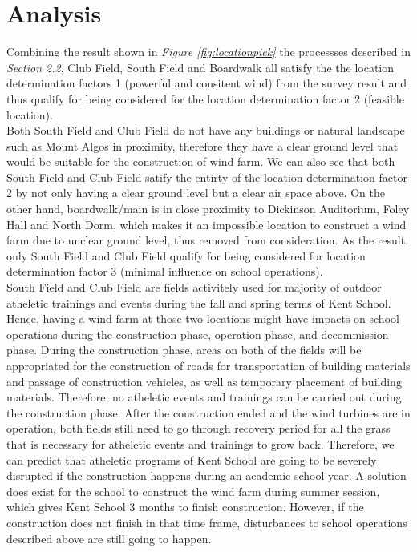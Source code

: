 \documentclass[review]{elsarticle}
\begin{document}

\clearpage

\section{Analysis}

Combining the result shown in \textit{Figure \ref{fig:locationpick}} the processses described in \textit{Section 2.2}, Club Field, South Field and Boardwalk all satisfy the the location determination factors 1 (powerful and consitent wind) 
from the survey result and thus qualify for being considered for the location determination factor 2 (feasible location).  %
\\\indent Both South Field and Club Field do not have any buildings or natural landscape such as Mount Algos in proximity, therefore they have a clear ground level that would 
be suitable for the construction of wind farm. We can also see that both South Field and Club Field satify the entirty of the location determination factor 2 by not only having 
a clear ground level but a clear air space above. On the other hand, boardwalk/main is in close proximity to Dickinson Auditorium, Foley Hall and North Dorm, which makes it an 
impossible location to construct a wind farm due to unclear ground level, thus removed from consideration. As the result, only South Field and Club Field qualify for being 
considered for location determination factor 3 (minimal influence on school operations).
\\\indent South Field and Club Field are fields activitely used for majority of outdoor atheletic trainings and events during the fall and spring terms of Kent School. Hence, 
having a wind farm at those two locations might have impacts on school operations during the construction phase, operation phase, and decommission phase. During the construction 
phase, areas on both of the fields will be appropriated for the construction of roads for transportation of building materials and passage of construction vehicles, as well as
temporary placement of building materials. Therefore, no atheletic events and trainings can be carried out during the construction phase. After the construction ended and the wind 
turbines are in operation, both fields still need to go through recovery period for all the grass that is necessary for atheletic events and trainings to grow back. Therefore, we 
can predict that atheletic programs of Kent School are going to be severely disrupted if the construction happens during an academic school year. A solution does exist for the school 
to construct the wind farm during summer session, which gives Kent School 3 months to finish construction. However, if the construction does not finish in that time frame, disturbances 
to school operations described above are still going to happen. %
\end{document}
